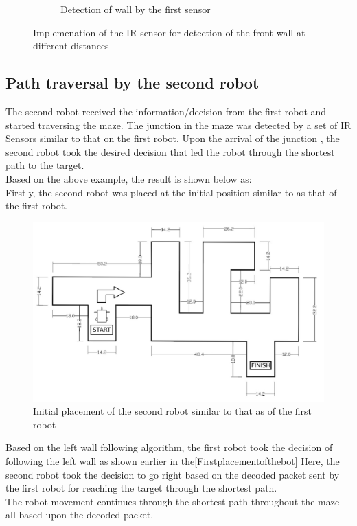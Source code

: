 \begin{figure}[h]
\begin{center}
\begin{subfigure}[b]{0.5\textwidth}
                \caption{Detection of wall by the first sensor}
                
        \end{subfigure}
        \caption{Implemenation of the IR sensor for detection of the front wall at different distances}
\end{center} 
\end{figure}
\subsection{Path traversal by the second robot}
The second robot received the information/decision from the first robot and started traversing the maze. The junction in the maze was detected by a set of IR Sensors similar to that on the first robot.  Upon the arrival of the junction ,  the second robot took the desired decision that led the robot through the shortest path to the target.\\
Based on the above example, the result is shown below as: \\
Firstly, the second robot was placed at the initial position similar to as that of the first robot.
\begin{figure}[h]
\center
\includegraphics[scale=0.35]{part1_4new.jpg} 
\caption{Initial placement of the second robot similar to that as of the first robot}
\end{figure}
\justify Based on the left wall following algorithm, the first robot took the decision of following the left wall as shown earlier in the\ref{Firstplacementofthebot} Here, the second robot took the decision to go right based on the decoded packet sent by the first robot for reaching the target through the shortest path.\\
The robot movement continues through the shortest path throughout the maze all based upon the decoded packet.\\

